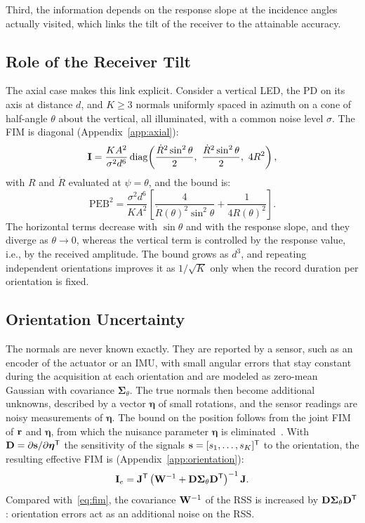 Third, the information depends on the response slope at the incidence angles actually visited, which links the tilt of the receiver to the attainable accuracy.

\subsection{Role of the Receiver Tilt}
\label{subsec:tilt}
The axial case makes this link explicit. Consider a vertical LED, the PD on its axis at distance $d$, and $K\geq3$ normals uniformly spaced in azimuth on a cone of half-angle $\theta$ about the vertical, all illuminated, with a common noise level $\sigma$. The FIM is diagonal (Appendix~\ref{app:axial}):
\begin{equation}
 \vect I=\frac{KA^2}{\sigma^2d^6}\diag\!\left(\frac{\dot R^2\sin^2\theta}{2},\ \frac{\dot R^2\sin^2\theta}{2},\ 4R^2\right),
 \label{eq:axial-fim}
\end{equation}
with $R$ and $\dot R$ evaluated at $\psi=\theta$, and the bound is:
\begin{equation}
 \mathrm{PEB}^2=\frac{\sigma^2d^6}{KA^2}\left[\frac{4}{\dot R(\theta)^2\sin^2\theta}+\frac{1}{4R(\theta)^2}\right].
 \label{eq:axial-peb}
\end{equation}
The horizontal terms decrease with $\sin\theta$ and with the response slope, and they diverge as $\theta\to0$, whereas the vertical term is controlled by the response value, i.e., by the received amplitude. The bound grows as $d^3$, and repeating independent orientations improves it as $1/\sqrt{K}$ only when the record duration per orientation is fixed.

\subsection{Orientation Uncertainty}
\label{subsec:orientation-uncertainty}
The normals are never known exactly. They are reported by a sensor, such as an encoder of the actuator or an IMU, with small angular errors that stay constant during the acquisition at each orientation and are modeled as zero-mean Gaussian with covariance $\bm\Sigma_\theta$. The true normals then become additional unknowns, described by a vector $\bm\eta$ of small rotations, and the sensor readings are noisy measurements of $\bm\eta$. The bound on the position follows from the joint FIM of $\mathbf{r}$ and $\bm\eta$, from which the nuisance parameter $\bm\eta$ is eliminated~\cite{Kay1993,Shen2022}. With $\mathbf{D}=\partial\mathbf{s}/\partial\bm\eta^{\mathsf T}$ the sensitivity of the signals $\mathbf{s}=[s_1,\ldots,s_K]^{\mathsf T}$ to the orientation, the resulting effective FIM is (Appendix~\ref{app:orientation}):
\begin{equation}
 {\mathbf{I}_e=\mathbf{J}^{\mathsf T}\left(\mathbf{W}^{-1}+\mathbf{D}\bm\Sigma_\theta\mathbf{D}^{\mathsf T}\right)^{-1}\mathbf{J}.}
 \label{eq:fim-orientation}
\end{equation}
Compared with~\eqref{eq:fim}, the covariance $\mathbf{W}^{-1}$ of the RSS is increased by $\mathbf{D}\bm\Sigma_\theta\mathbf{D}^{\mathsf T}$: orientation errors act as an additional noise on the RSS.

